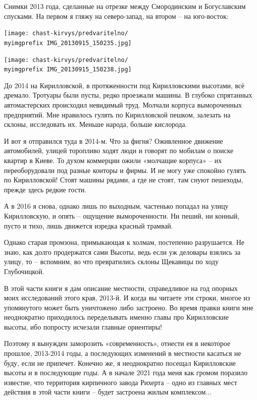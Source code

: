 Снимки 2013 года, сделанные на отрезке между Смородинским и Богуславским спусками. На первом я гляжу на северо-запад, на втором – на юго-восток:

\begin{center}
\texttt{[image: chast-kirvys/predvaritelno/\\myimgprefix IMG\_20130915\_150235.jpg]}
\end{center}

\begin{center}
\texttt{[image: chast-kirvys/predvaritelno/\\myimgprefix IMG\_20130915\_150238.jpg]}
\end{center}

\newpage

До 2014 на Кирилловской, в протяженности под Кирилловскими высотами, всё дремало. Тротуары были пусты, редко проезжали машины. В глубоко спрятанных автомастерских происходил невидимый труд. Молчали корпуса вымороченных предприятий. Мне нравилось гулять по Кирилловской пешком, залезать на склоны, исследовать их. Меньше народа, больше кислорода.
 
И вот я отправился туда в 2014-м. Что за фигня? Оживленное движение автомобилей, улицей торопливо ходят люди и говорят по мобилам о поиске квартир в Киеве. То духом коммерции ожили «молчащие корпуса» – их переоборудовали под разные конторы и фирмы. И не могу уже спокойно гулять по Кирилловской! Стоят машины рядами, а где не стоят, там снуют пешеходы, прежде здесь редкие гости.

А в 2016 я снова, однако лишь по выходным, частенько попадал на улицу Кирилловскую, и опять – ощущение вымороченности. Ни пеший, ни конный, пусто и тихо, лишь движется изредка красный трамвай. 

Однако старая промзона, примыкающая к холмам, постепенно разрушается. Не знаю, как долго продержатся сами Высоты, ведь если уж деловары взялись за улицу, то – вспомним, во что превратились склоны Щекавицы по ходу Глубочицкой.

В этой части книги я дам описание местности, справедливое на год опорных моих исследований этого края, 2013-й. И когда вы читаете эти строки, многое из упомянутого может быть уничтожено либо застроено. Во время правки книги мне неоднократно приходилось переделывать именно главы про Кирилловские высоты, ибо попросту исчезали главные ориентиры!

Поэтому я вынужден заморозить «современность», отнести ея в некоторое прошлое, 2013-2014 годы, а последующих изменений в местности касаться не буду, если не припечет. Конечно же, я неоднократно посещал Кирилловские высоты и в последующие годы. А в начале 2021 года меня как громом поразило известие, что территория кирпичного завода Рихерта – одно из главных мест действия в этой части книги – будет застроена жилым комплексом...

